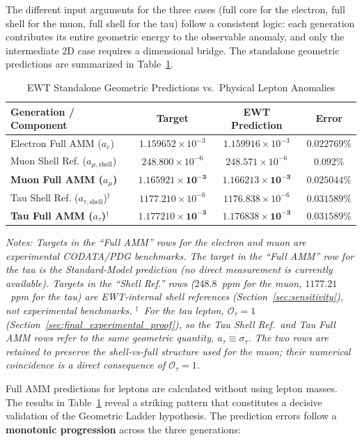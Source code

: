 \documentclass[10pt,a4paper]{article}
\begin{document}
The different input arguments for the three cases (full core for the electron, 
full shell for the muon, full shell for the tau) follow a consistent logic: 
each generation contributes its entire geometric energy to the observable 
anomaly, and only the intermediate 2D case requires a dimensional bridge. The 
standalone geometric predictions are summarized in 
Table~\ref{tab:final_results_confirmed}.

\begin{table}[ht]
	\centering
	\caption{EWT Standalone Geometric Predictions vs.\ Physical Lepton Anomalies}
	\label{tab:final_results_confirmed}
	\begin{tabular}{lccc}
		\toprule
		\textbf{Generation / Component} & \textbf{Target} & \textbf{EWT Prediction} & \textbf{Error} \\
		\midrule
		Electron Full AMM (\(a_e\)) & \(1.159652 \times 10^{-3}\) & \(1.159916 \times 10^{-3}\) & \(0.022769\%\) \\
		\midrule
		Muon Shell Ref. (\(a_{\mu,\text{shell}}\)) & \(248.800 \times 10^{-6}\) & \(248.571 \times 10^{-6}\) & \(0.092\%\) \\
		\textbf{Muon Full AMM (\(a_{\mu}\))} & \(\mathbf{1.165921 \times 10^{-3}}\) & \(\mathbf{1.166213 \times 10^{-3}}\) & \(\mathbf{0.025044\%}\) \\
		\midrule
		Tau Shell Ref. (\(a_{\tau,\text{shell}}\))$^{\dagger}$ & \(1177.210 \times 10^{-6}\) & \(1176.838 \times 10^{-6}\) & \(0.031589\%\) \\
		\textbf{Tau Full AMM (\(a_{\tau}\))}$^{\dagger}$ & \(\mathbf{1.177210 \times 10^{-3}}\) & \(\mathbf{1.176838 \times 10^{-3}}\) & \(\mathbf{0.031589\%}\) \\
		\bottomrule
	\end{tabular}
	\begin{flushleft}
		\small \textit{Notes: Targets in the ``Full AMM'' rows for the electron and muon are experimental CODATA/PDG benchmarks. The target in the ``Full AMM'' row for the tau is the Standard-Model prediction (no direct measurement is currently available). Targets in the ``Shell Ref.'' rows ($248.8$~ppm for the muon, $1177.21$~ppm for the tau) are EWT-internal shell references (Section~\ref{sec:sensitivity}), not experimental benchmarks. $^{\dagger}$~For the tau lepton, $\mathcal{O}_\tau = 1$ (Section~\ref{sec:final_experimental_proof}), so the Tau Shell Ref.\ and Tau Full AMM rows refer to the same geometric quantity, $a_\tau \equiv \sigma_\tau$. The two rows are retained to preserve the shell-vs-full structure used for the muon; their numerical coincidence is a direct consequence of $\mathcal{O}_\tau = 1$.}
	\end{flushleft}
\end{table}
Full AMM predictions for leptons are calculated without using lepton masses.
The results in Table~\ref{tab:final_results_confirmed} reveal a striking 
pattern that constitutes a decisive validation of the Geometric Ladder 
hypothesis. The prediction errors follow a \textbf{monotonic progression} 
across the three generations:
\end{document}
